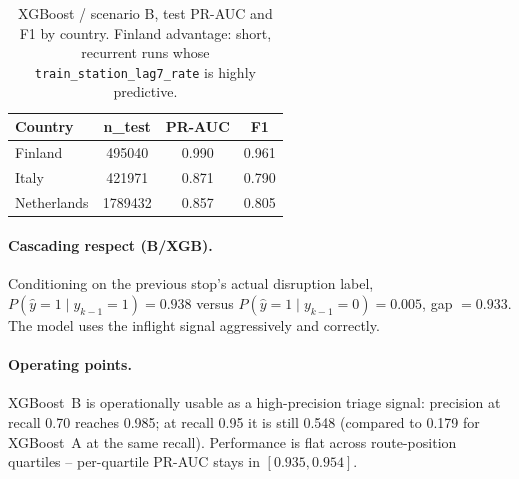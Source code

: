 \begin{table}[H]
    \centering
    \caption{XGBoost / scenario B, test PR-AUC and F1 by country. Finland advantage: short, recurrent runs whose \texttt{train\_station\_lag7\_rate} is highly predictive.}
    \label{tab:per-country}
    \footnotesize
    \begin{tabular}{l S[table-format=7.0,group-separator={,}] S[table-format=1.3] S[table-format=1.3]}
        \toprule
        Country & {n\_test} & {PR-AUC} & {F1} \\
        \midrule
        Finland     &  495040 & 0.990 & 0.961 \\
        Italy       &  421971 & 0.871 & 0.790 \\
        Netherlands & 1789432 & 0.857 & 0.805 \\
        \bottomrule
    \end{tabular}
\end{table}

\paragraph{Cascading respect (B/XGB).} Conditioning on the previous stop's actual disruption label,
$P(\hat{y}=1 \mid y_{k-1}=1)=\num{0.938}$ versus $P(\hat{y}=1 \mid y_{k-1}=0)=\num{0.005}$, gap $=\num{0.933}$. The model uses the inflight signal aggressively and correctly.

\paragraph{Operating points.} XGBoost~B is operationally usable as a high-precision triage signal: precision at recall \num{0.70} reaches \num{0.985}; at recall \num{0.95} it is still \num{0.548} (compared to \num{0.179} for XGBoost~A at the same recall). Performance is flat across route-position quartiles -- per-quartile PR-AUC stays in $[\num{0.935}, \num{0.954}]$.
